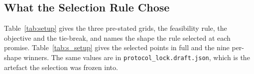 \documentclass[mathematics,supfile,submit,moreauthors]{Definitions/mdpi}
\begin{document}

\subsection{What the Selection Rule Chose}

Table~\ref{tab:setup} gives the three pre-stated grids, the feasibility rule, the
objective and the tie-break, and names the shape the rule selected at each promise.
Table~\ref{tab:s_setup} gives the selected points in full and the nine per-shape winners.
The same values are in \texttt{protocol\_lock.draft.json}, which is the artefact the
selection was frozen into.
\end{document}
